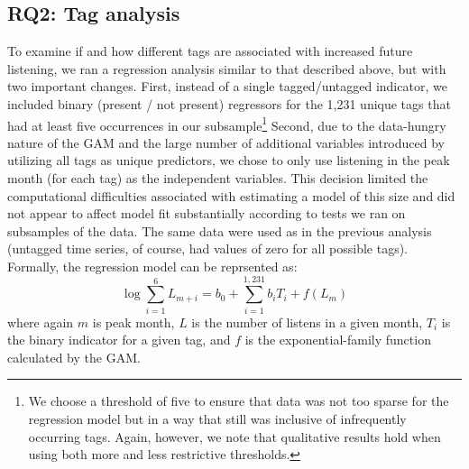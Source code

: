 \subsection{RQ2: Tag analysis}
To examine if and how different tags are associated with increased future listening, we ran a regression analysis similar to that described above, but with two important changes. First, instead of a single tagged/untagged indicator, we included binary (present / not present) regressors for the 1,231 unique tags that had at least five occurrences in our subsample\footnote{We choose a threshold of five to ensure that data was not too sparse for the regression model but in a way that still was inclusive of infrequently occurring tags.  Again, however, we note that qualitative results hold when using both more and less restrictive thresholds.} Second, due to the data-hungry nature of the GAM and the large number of additional variables introduced by utilizing all tags as unique predictors, we chose to only use listening in the peak month (for each tag) as the independent variables. This decision limited the computational difficulties associated with estimating a model of this size and did not appear to affect model fit substantially according to tests we ran on subsamples of the data. The same data were used as in the previous analysis (untagged time series, of course, had values of zero for all possible tags). Formally, the regression model can be reprsented as: 
\begin{equation}
\log \sum_{i=1}^{6}L_{m+i} = b_{0} +  \sum_{i=1}^{1,231}b_{i}T_{i} +f(L_{m})
\end{equation}
\noindent where again $m$ is peak month, $L$ is the number of listens in a given month, $T_{i}$ is the binary indicator for a given tag, and $f$ is the exponential-family function calculated by the GAM.
